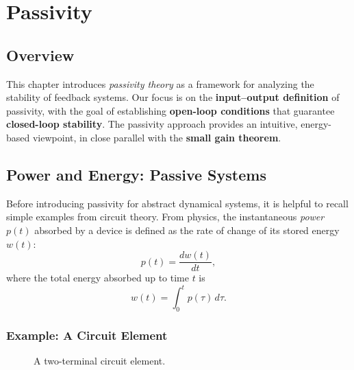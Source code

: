 \chapterspaceabove{6.75cm} %
\chapterspacebelow{7.25cm} %

\chapter{Passivity}
\section{Overview}
This chapter introduces \emph{passivity theory} as a framework for analyzing the stability of feedback systems. 
Our focus is on the \textbf{input--output definition} of passivity, with the goal of establishing 
\textbf{open-loop conditions} that guarantee \textbf{closed-loop stability}. 
The passivity approach provides an intuitive, energy-based viewpoint, in close parallel with the 
\textbf{small gain theorem}.

\section{Power and Energy: Passive Systems}

Before introducing passivity for abstract dynamical systems, it is helpful to recall 
simple examples from circuit theory. From physics, the instantaneous \emph{power} $p(t)$ 
absorbed by a device is defined as the rate of change of its stored energy $w(t)$:
\begin{equation}
    p(t) = \frac{d w(t)}{dt},
\end{equation}
where the total energy absorbed up to time $t$ is
\begin{equation}
    w(t) = \int_{0}^{t} p(\tau)\, d\tau.
\end{equation}

\subsection{Example: A Circuit Element}

\begin{figure}[h]
    \centering
    \caption{A two-terminal circuit element.}
    \label{fig:passive_element}
\end{figure}

